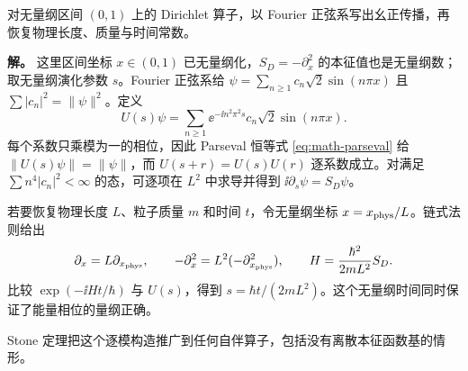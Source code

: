\begin{example}[区间能谱与物理时间的恢复]
对无量纲区间 $(0,1)$ 上的 Dirichlet 算子，以 Fourier 正弦系写出幺正传播，再恢复物理长度、质量与时间常数。

\textbf{解。} 这里区间坐标 \(x\in(0,1)\) 已无量纲化，\(S_D=-\partial_x^2\) 的本征值也是无量纲数；取无量纲演化参数 \(s\)。Fourier 正弦系给 \(\psi=\sum_{n\ge1}c_n\sqrt2\sin(n\pi x)\) 且 \(\sum|c_n|^2=\|\psi\|^2\)。定义
\[
U(s)\psi=\sum_{n\ge1}\ee^{-\ii n^2\pi^2s}c_n\sqrt2\sin(n\pi x).
\]
每个系数只乘模为一的相位，因此 Parseval 恒等式 \cref{eq:math-parseval} 给 \(\|U(s)\psi\|=\|\psi\|\)，而 \(U(s+r)=U(s)U(r)\) 逐系数成立。对满足 \(\sum n^4|c_n|^2<\infty\) 的态，可逐项在 \(L^2\) 中求导并得到 \(\ii\partial_s\psi=S_D\psi\)。

若要恢复物理长度 \(L\)、粒子质量 \(m\) 和时间 \(t\)，令无量纲坐标
\(x=x_{\rm phys}/L\)。链式法则给出
\[
\partial_x=L\partial_{x_{\rm phys}},\qquad
-\partial_x^2=L^2(-\partial_{x_{\rm phys}}^2),\qquad
H=\frac{\hbar^2}{2mL^2}S_D.
\]
比较 \(\exp(-\ii Ht/\hbar)\) 与 \(U(s)\)，得到
\(s=\hbar t/(2mL^2)\)。这个无量纲时间同时保证了能量相位的量纲正确。
\end{example}

Stone 定理把这个逐模构造推广到任何自伴算子，包括没有离散本征函数基的情形。


